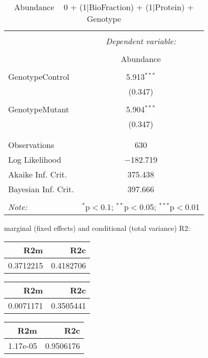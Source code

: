 \documentclass[11pt]{report}
\begin{document}
\begin{table}[!htbp] \centering 
  \caption{Abundance ~ 0 + (1|BioFraction) + (1|Protein) + Genotype} 
  \label{} 
\begin{tabular}{@{\extracolsep{5pt}}lc} 
\\[-1.8ex]\hline 
\hline \\[-1.8ex] 
 & \multicolumn{1}{c}{\textit{Dependent variable:}} \\ 
\cline{2-2} 
\\[-1.8ex] & Abundance \\ 
\hline \\[-1.8ex] 
 GenotypeControl & 5.913$^{***}$ \\ 
  & (0.347) \\ 
  & \\ 
 GenotypeMutant & 5.904$^{***}$ \\ 
  & (0.347) \\ 
  & \\ 
\hline \\[-1.8ex] 
Observations & 630 \\ 
Log Likelihood & $-$182.719 \\ 
Akaike Inf. Crit. & 375.438 \\ 
Bayesian Inf. Crit. & 397.666 \\ 
\hline 
\hline \\[-1.8ex] 
\textit{Note:}  & \multicolumn{1}{r}{$^{*}$p$<$0.1; $^{**}$p$<$0.05; $^{***}$p$<$0.01} \\ 
\end{tabular} 
\end{table} 
marginal (fixed effects) and conditional (total variance) R2:

\begin{tabular}{r|r}
\hline
R2m & R2c\\
\hline
0.3712215 & 0.4182706\\
\hline
\end{tabular}

\begin{tabular}{r|r}
\hline
R2m & R2c\\
\hline
0.0071171 & 0.3505441\\
\hline
\end{tabular}

\begin{tabular}{r|r}
\hline
R2m & R2c\\
\hline
1.17e-05 & 0.9506176\\
\hline
\end{tabular}
\end{document}
